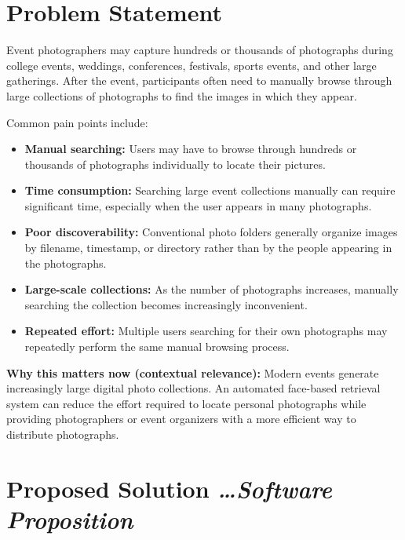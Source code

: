 \documentclass[11pt,a4paper]{article}
\newcommand{\BvrHint}[1]{%
  {\normalfont\normalsize\itshape\hfill #1}}
\begin{document}
\section{Problem Statement}

Event photographers may capture hundreds or thousands of photographs
during college events, weddings, conferences, festivals, sports events,
and other large gatherings. After the event, participants often need to
manually browse through large collections of photographs to find the
images in which they appear.

Common pain points include:

\begin{itemize}[leftmargin=0.7cm]
    \item \textbf{Manual searching:} Users may have to browse through
    hundreds or thousands of photographs individually to locate their
    pictures.

    \item \textbf{Time consumption:} Searching large event collections
    manually can require significant time, especially when the user
    appears in many photographs.

    \item \textbf{Poor discoverability:} Conventional photo folders
    generally organize images by filename, timestamp, or directory
    rather than by the people appearing in the photographs.

    \item \textbf{Large-scale collections:} As the number of photographs
    increases, manually searching the collection becomes increasingly
    inconvenient.

    \item \textbf{Repeated effort:} Multiple users searching for their
    own photographs may repeatedly perform the same manual browsing
    process.
\end{itemize}

\textbf{Why this matters now (contextual relevance):} Modern events
generate increasingly large digital photo collections. An automated
face-based retrieval system can reduce the effort required to locate
personal photographs while providing photographers or event organizers
with a more efficient way to distribute photographs.

\section{Proposed Solution %
\BvrHint{\ldots Software Proposition}}
\end{document}

